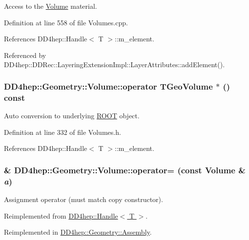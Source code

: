 Access to the \hyperlink{class_d_d4hep_1_1_geometry_1_1_volume}{Volume} material. 

Definition at line 558 of file Volumes.cpp.

References DD4hep::Handle$<$ T $>$::m\_\-element.

Referenced by DD4hep::DDRec::LayeringExtensionImpl::LayerAttributes::addElement().\hypertarget{class_d_d4hep_1_1_geometry_1_1_volume_ae810687dc4b2e3ad5e9a99290eb88ce5}{
\subsubsection[{operator TGeoVolume $\ast$}]{\setlength{\rightskip}{0pt plus 5cm}DD4hep::Geometry::Volume::operator TGeoVolume $\ast$ () const}}
\label{class_d_d4hep_1_1_geometry_1_1_volume_ae810687dc4b2e3ad5e9a99290eb88ce5}


Auto conversion to underlying \hyperlink{namespace_r_o_o_t}{ROOT} object. 

Definition at line 332 of file Volumes.h.

References DD4hep::Handle$<$ T $>$::m\_\-element.\hypertarget{class_d_d4hep_1_1_geometry_1_1_volume_af071e34d365d16c7f7dfe5b2fe59d520}{
\subsubsection[{operator=}]{\& DD4hep::Geometry::Volume::operator= (const {\bf Volume} \& {\em a})}}
\label{class_d_d4hep_1_1_geometry_1_1_volume_af071e34d365d16c7f7dfe5b2fe59d520}


Assignment operator (must match copy constructor). 

Reimplemented from \hyperlink{class_d_d4hep_1_1_handle_a9bbf8f498df42e81ad26fb00233505a6}{DD4hep::Handle$<$ T $>$}.

Reimplemented in \hyperlink{class_d_d4hep_1_1_geometry_1_1_assembly_a49d6772ff3ef1ed2a49a27ce35caaaac}{DD4hep::Geometry::Assembly}.

